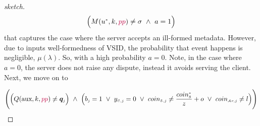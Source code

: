 \begin{proof}[sketch]
  $$\Big(M(u^{\scriptscriptstyle *},k,\textcolor{purple}{pp})\neq \sigma\ \wedge \ a=1\Big)$$
     that captures the case where the server accepts an ill-formed metadata. However, due to inputs well-formedness of VSID, the probability that event happens is negligible, $\mu(\lambda)$. So, with a high probability $a=0$.  Note, in the  case where $a=0$, the server does not raise any dispute, instead it avoids serving the client. Next, we move on to 
     
     $$\Bigg(\Big(Q(\text{aux},k,\textcolor{purple}{pp})\neq \bm{q}_{\scriptscriptstyle j}\Big)\ \wedge \ \Big(b_{\scriptscriptstyle j}=1\ \vee \ y_{\scriptscriptstyle\mathcal{C},j}=0 \ \vee \ coin_{\scriptscriptstyle\mathcal{S},j}\neq \frac{coin_{\scriptscriptstyle\mathcal S}^{\scriptscriptstyle*}}{z}+o \ \vee \ coin_{\scriptscriptstyle\mathcal{A}r,j}\neq l\Big)\Bigg)$$
     

\end{proof}
